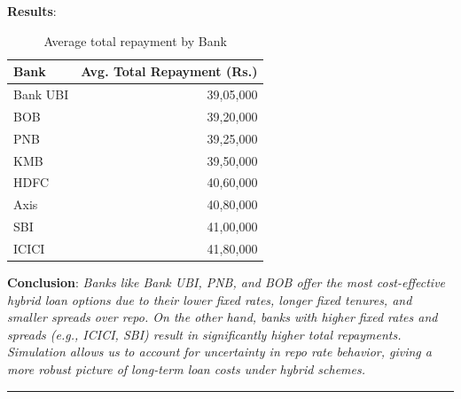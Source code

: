\begin{itemize}
\textbf{Results}:\\
\begin{table}[h]
    \centering
    \begin{tabular}{lr}
        \toprule
        \textbf{Bank} & \textbf{Avg. Total Repayment (Rs.)} \\
        \midrule
        Bank UBI & 39,05,000 \\
        BOB      & 39,20,000 \\
        PNB      & 39,25,000 \\
        KMB      & 39,50,000 \\
        HDFC     & 40,60,000 \\
        Axis     & 40,80,000 \\
        SBI      & 41,00,000 \\
        ICICI    & 41,80,000 \\
        \bottomrule
    \end{tabular}
    \caption{Average total repayment by Bank}
    \label{tab:avg-repayment}
\end{table}


\textbf{Conclusion}: \textit{Banks like Bank UBI, PNB, and BOB offer the most cost-effective hybrid loan options due to their lower fixed rates, longer fixed tenures, and smaller spreads over repo. On the other hand, banks with higher fixed rates and spreads (e.g., ICICI, SBI) result in significantly higher total repayments.
\\
Simulation allows us to account for uncertainty in repo rate behavior, giving a more robust picture of long-term loan costs under hybrid schemes.}

\end{itemize}
\hrule